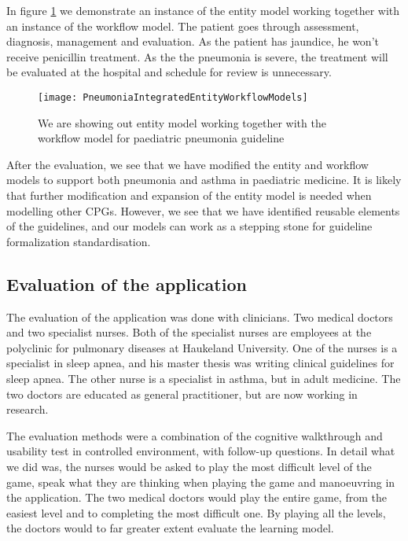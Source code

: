 In figure \ref{fig:PneumoniaPneumoniaIntegratedEntityWorkflowModels} we demonstrate an instance of the entity model working together with an instance of the workflow model. The patient goes through assessment, diagnosis, management and evaluation. As the patient has jaundice, he won't receive penicillin treatment. As the the pneumonia is severe, the treatment will be evaluated at the hospital and schedule for review is unnecessary. 
\begin{figure}[h!]
	\label{fig:PneumoniaPneumoniaIntegratedEntityWorkflowModels}
	\texttt{[image: PneumoniaIntegratedEntityWorkflowModels]}
	\caption {We are showing out entity model working together with the workflow model for paediatric pneumonia guideline \parencite{RepublicofKeny2016}}	
\end{figure}

After the evaluation, we see that we have modified the entity and workflow models to support both pneumonia and asthma in paediatric medicine. It is likely that further modification and expansion of the entity model is needed when modelling other CPGs. However, we see that we have identified reusable elements of the guidelines, and our models can work as a stepping stone for guideline formalization standardisation.


\subsection{Evaluation of the application}
The evaluation of the application was done with clinicians.	Two medical doctors and two specialist nurses. Both of the specialist nurses are employees at the polyclinic for pulmonary diseases at Haukeland University. One of the nurses is a specialist in sleep apnea, and his master thesis was writing clinical guidelines for sleep apnea. The other nurse is a specialist in asthma, but in adult medicine. The two doctors are educated as general practitioner, but are now working in research.

The evaluation methods were a combination of the cognitive walkthrough and usability test in controlled environment, with follow-up questions. In detail what we did was, the nurses would be asked to play the most difficult level of the game, speak what they are thinking when playing the game and manoeuvring in the application.  The two medical doctors would play the entire game, from the easiest level and to completing the most difficult one. By playing all the levels, the doctors would to far greater extent evaluate the learning model.


